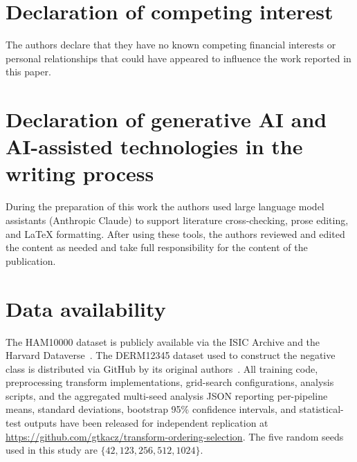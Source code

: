\documentclass[preprint,5p,times,twocolumn]{elsarticle}
\begin{document}
\section*{Declaration of competing interest}
The authors declare that they have no known competing financial interests or personal relationships that could have appeared to influence the work reported in this paper.


\section*{Declaration of generative AI and AI-assisted technologies in the writing process}
During the preparation of this work the authors used large language model assistants (Anthropic Claude) to support literature cross-checking, prose editing, and LaTeX formatting. After using these tools, the authors reviewed and edited the content as needed and take full responsibility for the content of the publication.


\section*{Data availability}
The HAM10000 dataset is publicly available via the ISIC Archive and the Harvard Dataverse~\cite{Tschandl2018}. The DERM12345 dataset used to construct the negative class is distributed via GitHub by its original authors~\cite{yilmaz2024derm12345largemultisourcedermatoscopic}. All training code, preprocessing transform implementations, grid-search configurations, analysis scripts, and the aggregated multi-seed analysis JSON reporting per-pipeline means, standard deviations, bootstrap 95\% confidence intervals, and statistical-test outputs have been released for independent replication at \url{https://github.com/gtkacz/transform-ordering-selection}. The five random seeds used in this study are $\{42, 123, 256, 512, 1024\}$.



\end{document}
